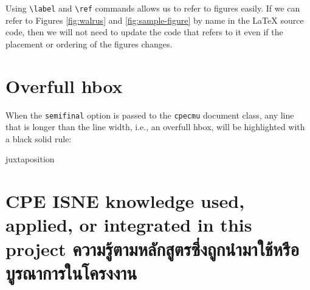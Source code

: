 Using \verb.\label. and \verb.\ref. commands allows us to refer to
figures easily. If we can refer to Figures
\ref{fig:walrus} and \ref{fig:sample-figure} by name in the {\LaTeX}
source code, then we will not need to update the code that refers to it
even if the placement or ordering of the figures changes.



\loremipsum\loremipsum\loremipsum

\section{Overfull hbox}

When the \verb.semifinal. option is passed to the \verb.cpecmu. document class,
any line that is longer than the line width, i.e., an overfull hbox, will be
highlighted with a black solid rule:
\begin{center}
\begin{minipage}{2em}
juxtaposition
\end{minipage}
\end{center}

\section{\ifenglish%
\ifcpe CPE \else ISNE \fi knowledge used, applied, or integrated in this project
\else%
ความรู้ตามหลักสูตรซึ่งถูกนำมาใช้หรือบูรณาการในโครงงาน
\fi
}

